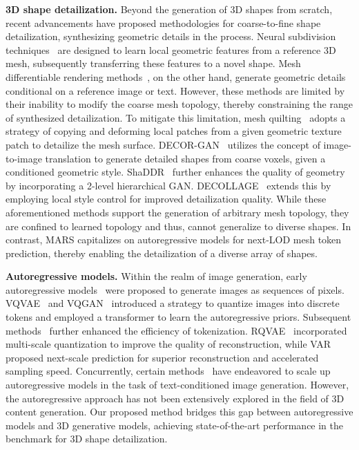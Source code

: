 \noindent\textbf{3D shape detailization.}
Beyond the generation of 3D shapes from scratch, recent advancements have proposed methodologies for coarse-to-fine shape detailization, synthesizing geometric details in the process. Neural subdivision techniques~\cite{DBLP:journals/tog/LiuKCAJ20, 3DStyleNet} are designed to learn local geometric features from a reference 3D mesh, subsequently transferring these features to a novel shape. Mesh differentiable rendering methods~\cite{DBLP:journals/tog/LiuTJ18, Text2Mesh}, on the other hand, generate geometric details conditional on a reference image or text. However, these methods are limited by their inability to modify the coarse mesh topology, thereby constraining the range of synthesized detailization. To mitigate this limitation, mesh quilting~\cite{DBLP:journals/tog/ZhouHWTDGS06} adopts a strategy of copying and deforming local patches from a given geometric texture patch to detailize the mesh surface. DECOR-GAN~\cite{decorgan} utilizes the concept of image-to-image translation to generate detailed shapes from coarse voxels, given a conditioned geometric style. ShaDDR~\cite{shaddr} further enhances the quality of geometry by incorporating a 2-level hierarchical GAN. DECOLLAGE~\cite{DECOLLAGE} extends this by employing local style control for improved detailization quality. While these aforementioned methods support the generation of arbitrary mesh topology, they are confined to learned topology and thus, cannot generalize to diverse shapes. In contrast, MARS capitalizes on autoregressive models for next-LOD mesh token prediction, thereby enabling the detailization of a diverse array of shapes.

\noindent\textbf{Autoregressive models.}
Within the realm of image generation, early autoregressive models~\cite{pixelcnn,pixelcnnplus} were proposed to generate images as sequences of pixels. VQVAE~\cite{vqvae} and VQGAN~\cite{vqgan} introduced a strategy to quantize images into discrete tokens and employed a transformer to learn the autoregressive priors. Subsequent methods~\cite{maskgit,DBLP:journals/corr/abs-2406-07550} further enhanced the efficiency of tokenization. RQVAE~\cite{rqvae} incorporated multi-scale quantization to improve the quality of reconstruction, while VAR~\cite{var} proposed next-scale prediction for superior reconstruction and accelerated sampling speed. Concurrently, certain methods~\cite{DBLP:conf/icml/RameshPGGVRCS21,DBLP:journals/corr/abs-2406-06525} have endeavored to scale up autoregressive models in the task of text-conditioned image generation. However, the autoregressive approach has not been extensively explored in the field of 3D content generation. Our proposed method bridges this gap between autoregressive models and 3D generative models, achieving state-of-the-art performance in the benchmark for 3D shape detailization.

